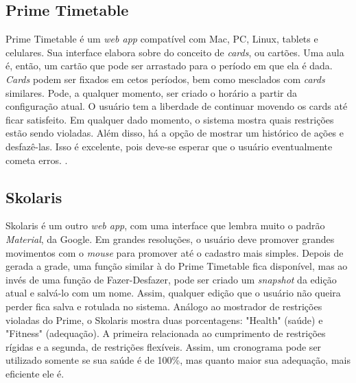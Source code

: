 \documentclass[12pt,a4paper]{article}
\begin{document}
		\subsection{Prime Timetable}

			\par Prime Timetable é um \textit{web app} compatível com Mac, PC, Linux, tablets e celulares. Sua interface elabora sobre do conceito de \textit{cards}, ou cartões. Uma aula é, então, um cartão que pode ser arrastado para o período em que ela é dada.  \textit{Cards} podem ser fixados em cetos períodos, bem como mesclados com \textit{cards} similares. Pode, a qualquer momento, ser criado o horário a partir da configuração atual. O usuário tem a liberdade de continuar movendo os cards até ficar satisfeito. Em qualquer dado momento, o sistema mostra quais restrições estão sendo violadas. Além disso, há a opção de mostrar um histórico de ações e desfazê-las. Isso é excelente, pois deve-se esperar que o usuário eventualmente cometa erros. \cite{norman, gnome_hig}.

		\subsection{Skolaris}

			\par Skolaris é um outro \textit{web app}, com uma interface que lembra muito o padrão \textit{Material}, da Google. Em grandes resoluções, o usuário deve promover grandes movimentos com o \textit{mouse} para promover até o cadastro mais simples. Depois de gerada a grade, uma função similar à do Prime Timetable fica disponível, mas ao invés de uma função de Fazer-Desfazer, pode ser criado um \textit{snapshot} da edição atual e salvá-lo com um nome. Assim, qualquer edição que o usuário não queira perder fica salva e rotulada no sistema. Análogo ao mostrador de restrições violadas do Prime, o Skolaris mostra duas porcentagens: "Health" (saúde) e "Fitness" (adequação). A primeira relacionada ao cumprimento de restrições rígidas e a segunda, de restrições flexíveis. Assim, um cronograma pode ser utilizado somente se sua saúde é de 100\%, mas quanto maior sua adequação, mais eficiente ele é.


\end{document}
